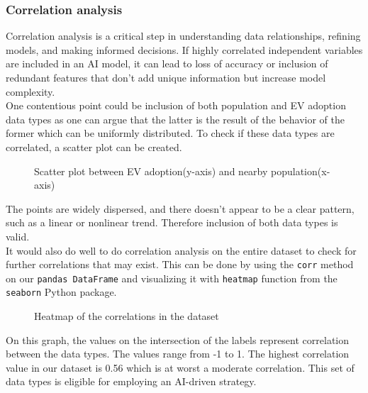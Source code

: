 \subsubsection{Correlation analysis}
Correlation analysis is a critical step in understanding data relationships, refining models, and making informed decisions. If highly correlated independent variables are included in an AI model, it can lead to loss of accuracy or inclusion of redundant features that don't add unique information but increase model complexity.\\
One contentious point could be inclusion of both population and EV adoption data types as one can argue that the latter is the result of the behavior of the former which can be uniformly distributed. To check if these data types are correlated, a scatter plot can be created.
\begin{figure}[H]
\vskip -0.5cm
\begin{center}

\caption{Scatter plot between EV adoption(y-axis) and nearby population(x-axis)}
\end{center}
\end{figure}
The points are widely dispersed, and there doesn’t appear to be a clear pattern, such as a linear or nonlinear trend. Therefore inclusion of both data types is valid.\\
It would also do well to do correlation analysis on the entire dataset to check for further correlations that may exist. This can be done by using the \verb|corr| method on our \verb|pandas DataFrame| and visualizing it with \verb|heatmap| function from the \verb|seaborn| Python package.
\begin{figure}[H]
\vskip -0.5cm
\begin{center}

\caption{Heatmap of the correlations in the dataset}
\end{center}
\end{figure}
On this graph, the values on the intersection of the labels represent correlation between the data types. The values range from -1 to 1. The highest correlation value in our dataset is 0.56 which is at worst a moderate correlation. This set of data types is eligible for employing an AI-driven strategy. 

